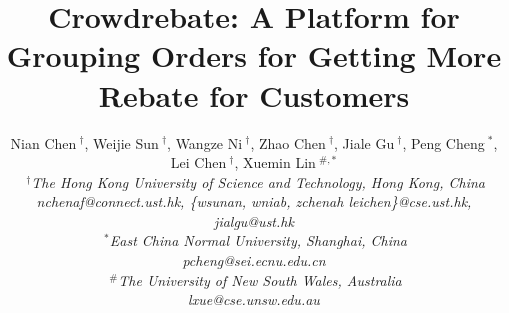\documentclass[conference]{IEEEtran}
\title{Crowdrebate: A Platform for Grouping Orders for Getting More Rebate for Customers}
\author{
	{Nian Chen{\small $~^{\dagger}$}, Weijie Sun{\small $~^{\dagger}$}, Wangze Ni{\small $~^{\dagger}$}, Zhao Chen{\small $~^{\dagger}$}, Jiale Gu{\small $~^{\dagger}$}, Peng Cheng{\small $~^{*}$}, Lei Chen{\small $~^{\dagger}$}, Xuemin Lin{\small $~^{\#,*}$}
	} \\
	\fontsize{10}{10}\selectfont\itshape
	$~^{\dagger}$The Hong Kong University of Science and Technology, Hong Kong, China\\
	\fontsize{9}{9}\selectfont\ttfamily\upshape
	nchenaf@connect.ust.hk, \{wsunan, wniab, zchenah leichen\}@cse.ust.hk, jialgu@ust.hk\\
	\fontsize{10}{10}\selectfont\itshape
	$~^{*}$East China Normal University, Shanghai, China\\
	\fontsize{9}{9}\selectfont\ttfamily\upshape pcheng@sei.ecnu.edu.cn \\
	\fontsize{10}{10}\selectfont\itshape
	$~^{\#}$The University of New South Wales, Australia\\
	\fontsize{9}{9}\selectfont\ttfamily\upshape
	lxue@cse.unsw.edu.au\\
}
\begin{document}
\maketitle





%



\balance




\bgroup\small

\let\xxx=\bibitem\def\bibitem{\par\vspace{0mm}\xxx} %

\egroup

\nobalance
\newpage
\end{document}
